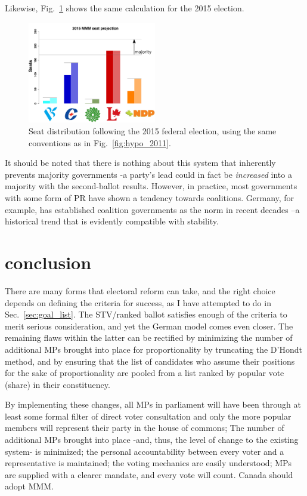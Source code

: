 \documentclass[DIV=calc, paper=a4, fontsize=11pt, twocolumn]{scrartcl}	 %
\begin{document}
Likewise, Fig.~\ref{fig:hypo_2015} shows the same calculation for the 2015 election.

\begin{figure}[h!]
  \includegraphics[width=0.50\textwidth,clip]{Figs/2015_seat_projection}
  \caption{ Seat distribution following the 2015 federal election, using the same conventions as in Fig.~\ref{fig:hypo_2011}.}
\label{fig:hypo_2015}
\end{figure}
It should be noted that there is nothing about this system that inherently prevents majority governments \--a party's lead could in fact be \emph{increased} into a majority with the second-ballot results. However, in practice, most governments with some form of PR have shown a tendency towards coalitions. Germany, for example, has established coalition governments as the norm in recent decades \---a historical trend that is evidently compatible with  stability.


\section{conclusion}	

There are many forms that electoral reform can take, and the right choice depends on defining the criteria for success, as I have attempted to do in Sec.~\ref{sec:goal_list}. The STV/ranked ballot satisfies enough of the criteria to merit serious consideration, and yet the German model comes even closer. 
The remaining flaws within the latter can be rectified by minimizing the number of additional MPs brought into place for proportionality by truncating the D'Hondt method, and by ensuring that the list of candidates who assume their positions for the sake of proportionality are pooled from a list ranked by popular vote (share) in their constituency. 

By implementing these changes, all MPs in parliament will have been through at least some formal filter of direct voter consultation and only the more popular members will represent their party in the house of commons; The number of additional MPs brought into place \--and, thus, the level of change to the existing system\-- is minimized; the  personal accountability between every voter and a representative is maintained; the voting mechanics are easily understood; MPs are supplied with a clearer mandate, and every vote will count.
Canada should adopt MMM. 
\end{document}
